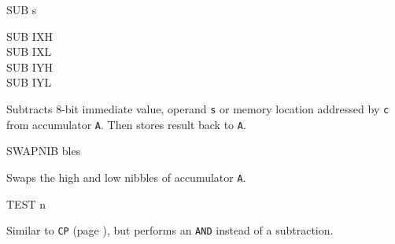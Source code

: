 \begin{basedescript}{
    \desclabelstyle{\multilinelabel}
    \desclabelwidth{3cm}}
\begin{DetailItem}{SUB s}
\begin{DetailVariants}
            \columnbreak
            SUB IXH\UNDOC\\
            SUB IXL\UNDOC\\
            SUB IYH\UNDOC\\
            SUB IYL\UNDOC
        \end{DetailVariants}

        Subtracts 8-bit immediate value, operand {\tt s} or memory location addressed by {\tt c} from accumulator {\tt A}. Then stores result back to {\tt A}.

        \begin{DetailEffects}[v]
            \FlagsSUBr
        \end{DetailEffects}
						
        \begin{DetailTiming}
        \end{DetailTiming}

    \end{DetailItem}

    \begin{DetailItem}{SWAPNIB\ZXN}
        { bles}
        {\SymSWAPNIB}

        Swaps the high and low nibbles of accumulator {\tt A}.

        \begin{DetailEffects}
            \FlagsSWAPNIB
        \end{DetailEffects}
						
        \begin{DetailTiming}
        \end{DetailTiming}

    \end{DetailItem}

    \begin{DetailItem}{TEST n\ZXN}
        {}
        {\SymTEST}

        Similar to {\tt CP} (page \pageref{DetailRefCP}), but performs an {\tt AND} instead of a subtraction.

        \begin{DetailEffects}[p]
            \FlagsTESTn
        \end{DetailEffects}
						
        \begin{DetailTiming}
        \end{DetailTiming}


\end{DetailItem}
\end{basedescript}
